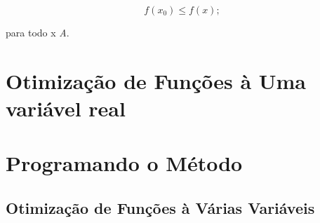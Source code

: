 			\begin{equation}
				f(x_0) \leq f(x);
			\end{equation}

		para todo x \in \textit{A}.


\section{{Otimização de Funções à Uma variável real}}

\hspace{0.8cm}

\section{{Programando o Método}}

\hspace{0.8cm}

\textcolor[rgb]{1,0,0}{\section{{Otimização de Funções à Várias Variáveis}}}

\hspace{0.8cm}
